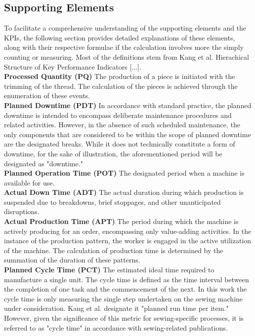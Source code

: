 {\subsection{Supporting Elements}
To facilitate a comprehensive understanding of the supporting elements and the KPIs, the following section provides detailed explanations of these elements, along with their respective formulae if the calculation involves more the simply counting or measuring. Most of the definitions stem from Kang et al. \cite{kangHierarchicalStructureKey2016} Hierachical Structure of Key Performance Indicators [...].\\

\textbf{Processed Quantity (PQ)}
The production of a piece is initiated with the trimming of the thread. The calculation of the pieces is achieved through the enumeration of these events.\\
\textbf{Planned Downtime (PDT)}
In accordance with standard practice, the planned downtime is intended to encompass deliberate maintenance procedures and related activities. However, in the absence of such scheduled maintenance, the only components that are considered to be within the scope of planned downtime are the designated breaks. While it does not technically constitute a form of downtime, for the sake of illustration, the aforementioned period will be designated as "downtime." \\
\textbf{Planned Operation Time (POT)}
The designated period when a machine is available for use. \\
\textbf{Actual Down Time (ADT)}
The actual duration during which production is suspended due to breakdowns, brief stoppages, and other unanticipated disruptions.\\
\textbf{Actual Production Time (APT)}
The period during which the machine is actively producing for an order, encompassing only value-adding activities.
In the instance of the production pattern, the worker is engaged in the active utilization of the machine. The calculation of production time is determined by the summation of the duration of these patterns.\\
\textbf{Planned Cycle Time (PCT)}
The estimated ideal time required to manufacture a single unit. The cycle time is defined as the time interval between the completion of one task and the commencement of the next. In this work the cycle time is only measuring the single step undertaken on the sewing machine under consideration. Kang et al. designate it "planned run time per item." However, given the significance of this metric for sewing-specific processes, it is referred to as "cycle time" in accordance with sewing-related publications.\\
}
